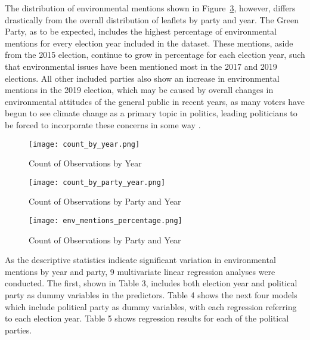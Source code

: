 \documentclass[12pt,letterpaper]{article}
\begin{document}
The distribution of environmental mentions shown in Figure~\ref{fig:env_mentions_perc}, however, differs drastically from the overall distribution of leaflets by party and year. The Green Party, as to be expected, includes the highest percentage of environmental mentions for every election year included in the dataset. These mentions, aside from the 2015 election, continue to grow in percentage for each election year, such that environmental issues have been mentioned most in the 2017 and 2019 elections. All other included parties also show an increase in environmental mentions in the 2019 election, which may be caused by overall changes in environmental attitudes of the general public in recent years, as many voters have begun to see climate change as a primary topic in politics, leading politicians to be forced to incorporate these concerns in some way \autocite{burnsWillBrexitDegrade2020}.











\begin{figure}[H]  %
	\centering
	\texttt{[image: count\_by\_year.png]} %
	\caption{Count of Observations by Year}
	\label{fig:count_by_year}
\end{figure}




\begin{figure}[H]
	\centering
	\texttt{[image: count\_by\_party\_year.png]} %
	\caption{Count of Observations by Party and Year}
	\label{fig:count_by_party_year}
\end{figure}

\vspace{-1cm}
\begin{figure}[H]
	\centering
	\texttt{[image: env\_mentions\_percentage.png]} %
	\caption{Count of Observations by Party and Year}
	\label{fig:env_mentions_perc}
\end{figure}



As the descriptive statistics indicate significant variation in environmental mentions by year and party, 9 multivariate linear regression analyses were conducted. The first, shown in Table 3, includes both election year and political party as dummy variables in the predictors. Table 4 shows the next four models which include political party as dummy variables, with each regression referring to each election year. Table 5 shows regression results for each of the political parties.
\end{document}
